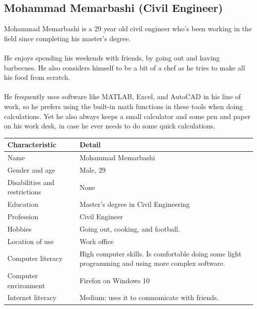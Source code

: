 \documentclass[11pt,onside]{report}
\begin{document}
\subsection{Mohammad Memarbashi (Civil Engineer)}
\begin{description}
Mohammad Memarbashi is a 29 year old civil engineer who’s been working in the field since completing his master’s degree. \\ \\

He enjoys spending his weekends with friends, by going out and having barbecues. He also considers himself to be a bit of a chef as he tries to make all his food from scratch. \\ \\

He frequently uses software like MATLAB, Excel, and AutoCAD in his line of work, so he prefers using the built-in math functions in these tools when doing calculations. Yet he also always keeps a small calculator and some pen and paper on his work desk, in case he ever needs to do some quick calculations.
\end{description}
\begin{center}
    \begin{tabular}{|p{4cm}|p{10cm}|}
        \hline
        \bf{Characteristic} & \bf{Detail} \\
        \hline
        Name &   Mohammad Memarbashi \\
        \hline
        Gender and age & Male, 29 \\
        \hline
        Disabilities and restrictions & None \\
        \hline
        Education & Master's degree in Civil Engineering \\
        \hline
        Profession & Civil Engineer \\
        \hline
        Hobbies & Going out, cooking, and football. \\
        \hline
        Location of use & Work office \\
        \hline
        Computer literacy & High computer skills. Is comfortable doing some light programming and using more complex software. \\
        \hline
        Computer environment &  Firefox on Windows 10 \\
        \hline
        Internet literacy & Medium; uses it to communicate with friends. \\
        \hline
    \end{tabular}
\end{center}
\end{document}

